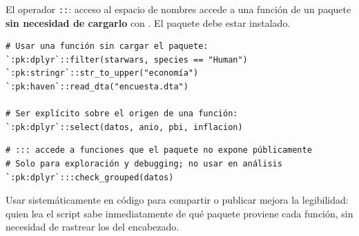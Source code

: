 \documentclass[8pt]{beamer}
\begin{document}
	\begin{frame}[fragile]{El operador \texttt{::}: acceso al espacio de nombres}
		 accede a una función de un paquete \textbf{sin necesidad de cargarlo} con . El paquete debe estar instalado.

\begin{lstlisting}[style=RScript]
# Usar una función sin cargar el paquete:
`:pk:dplyr`::filter(starwars, species == "Human")
`:pk:stringr`::str_to_upper("economía")
`:pk:haven`::read_dta("encuesta.dta")

# Ser explícito sobre el origen de una función:
`:pk:dplyr`::select(datos, anio, pbi, inflacion)
\end{lstlisting}

\begin{lstlisting}[style=RScript]
# ::: accede a funciones que el paquete no expone públicamente
# Solo para exploración y debugging; no usar en análisis
`:pk:dplyr`:::check_grouped(datos)
\end{lstlisting}

		\begin{exampleblock}{}
			Usar \rscript{::} sistemáticamente en código para compartir o publicar mejora la legibilidad: quien lea el script sabe inmediatamente de qué paquete proviene cada función, sin necesidad de rastrear los  del encabezado.
		\end{exampleblock}
	\end{frame}
\end{document}
